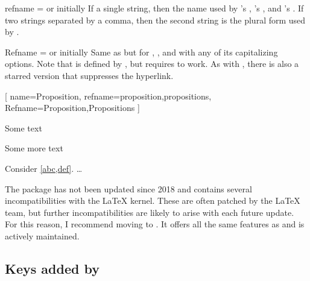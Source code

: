 \documentclass{ltxdoc}
\begin{document}
\begin{docKey}{refname}
  {= \textrm{or} }
  {initially }
If a single string, then the name used by 's , 's , and 's .
If two strings separated by a comma, then the second string is the plural form used by .
\end{docKey}

\begin{docKey}{Refname}
  {= \textrm{or} }
  {initially }
Same as  but for , , and  with any of its capitalizing options.
Note that  is defined by , but requires  to work.
As with , there is also a starred version  that suppresses the hyperlink.

\begin{codepreamble}
[
  name=Proposition,
  refname={proposition,propositions},
  Refname={Proposition,Propositions}
  ]
\end{codepreamble}

\begin{keythmscode}[withpreamble]
\begin{prop}[label=abc]
Some text
\end{prop}
\begin{prop}[label=def]
Some more text
\end{prop}
\begin{theorem}
Consider \cref{abc,def}.  \dots
\end{theorem}
\end{keythmscode}

\end{docKey}

\begin{notebox}
The  package has not been updated since 2018 and contains several incompatibilities with the \LaTeX{} kernel.
These are often patched by the \LaTeX{} team, but further incompatibilities are likely to arise with each future update.
For this reason, I recommend moving to .
It offers all the same features as  and is actively maintained.
\end{notebox}

\subsection{Keys added by } \label{thm-added-keys}
\end{document}
